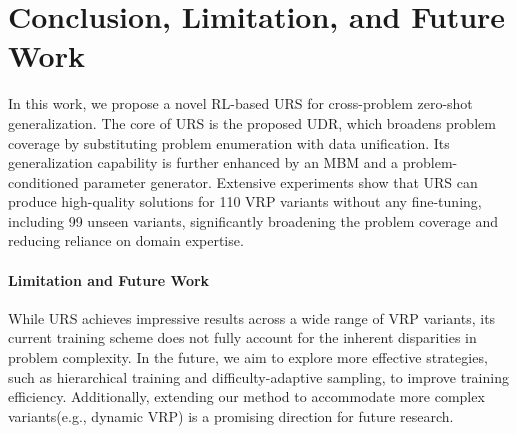 \documentclass{article}
\theoremstyle{plain}
\theoremstyle{definition}
\theoremstyle{remark}
\begin{document}
\section{Conclusion, Limitation, and Future Work}
\label{sec:conclusion_limitations}
In this work, we propose a novel RL-based URS for cross-problem zero-shot generalization. The core of URS is the proposed UDR, which broadens problem coverage by substituting problem enumeration with data unification. Its generalization capability is further enhanced by an MBM and a problem-conditioned parameter generator. Extensive experiments show that URS can produce high-quality solutions for 110 VRP variants without any fine-tuning, including 99 unseen variants, significantly broadening the problem coverage and reducing reliance on domain expertise.

\paragraph{Limitation and Future Work}
While URS achieves impressive results across a wide range of VRP variants, its current training scheme does not fully account for the inherent disparities in problem complexity. In the future, we aim to explore more effective strategies, such as hierarchical training and difficulty-adaptive sampling, to improve training efficiency. Additionally, extending our method to accommodate more complex variants(e.g., dynamic VRP) is a promising direction for future research. 




\end{document}
